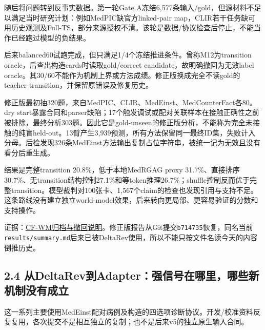 \documentclass[
  11pt,
  a4paper,
]{article}
\begin{document}
随后将问题转到反事实数据。第一轮Gate
A冻结6,577条输入/gold，但源材料不足以满足当时研究计划：例如MedPIC缺官方linked-pair
map，CLIR若干任务缺可用历史观测及Full-TS，部分来源授权不清。该轮是数据/协议检查后停止，不能当作已经跑过模型的负结果。

后来balanced60试跑完成，但只满足1/4个冻结推进条件。曾称M12为transition
oracle，后查出构造cards时读取gold/correct
candidate，故明确撤回为无效label
oracle。其30/60不能作为机制上界或方法成绩。修正版换成完全不读gold的teacher-transition，并保留原错误及修复历史。

修正版最初抽320题，来自MedPIC、CLIR、MedEinst、MedCounterFact各80。dry
start暴露合同和parser缺陷；17个触发调试或配对关联样本在接触正确性之前被排除，最终分析303题。因此它是gold-unseen的修正版分析，不能称为完全未接触的纯盲held-out。13臂产生3,939预测，所有方法保留同一最终ID集，失败计入分母。后检发现326条MedEinst方法输出复制占位字符串，被统一记为无效且没有看分后重生成。

结果是完整transition 20.8\%，低于本地MedRGAG proxy
31.7\%、直接排序30.7\%、无transition结构控制27.1\%和等token推理26.7\%；shuffle控制反而优于完整transition。模型裁判对100张卡、1,567个claim的检查也发现引用与支持不足。这条路线没有建立独立world-model效果，后来转向更局部、更容易验证的分数和支持操作。

证据：\href{https://github.com/xiotakut/cf_mrg/blob/main/papers/2026-10-02_cf_moa/author_dossier/records/archive/cf_wm.md}{CF-WM归档与撤回说明}。修正版报告从Git提交\texttt{b714735}恢复，同名当前\texttt{results/\allowbreak{}summary.\allowbreak{}md}后来已被DeltaRev使用，所以不能只按文件名读今天的内容倒推历史。

\subsection{2.4
从DeltaRev到Adapter：强信号在哪里，哪些新机制没有成立}\label{ux4ecedeltarevux5230adapterux5f3aux4fe1ux53f7ux5728ux54eaux91ccux54eaux4e9bux65b0ux673aux5236ux6ca1ux6709ux6210ux7acb}

这一系列主要使用MedEinst配对病例及构造的四选项诊断协议。开发/校准资料反复复用，各次提交不是相互独立的复制；也不是后来v5的独立原生输入合同。
\end{document}

